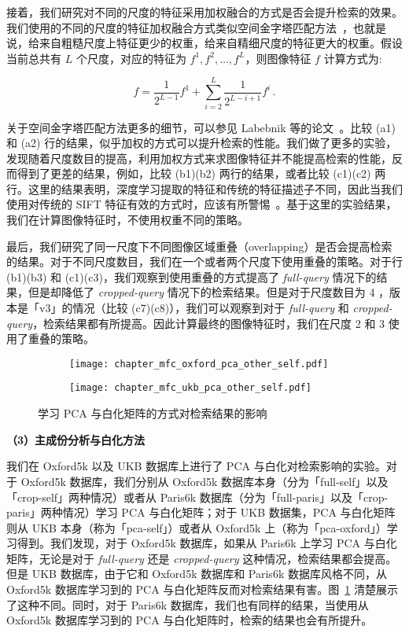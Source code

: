 接着，我们研究对不同的尺度的特征采用加权融合的方式是否会提升检索的效果。我们使用的不同的尺度的特征加权融合方式类似空间金字塔匹配方法~\cite{Lazebnik2006BeyondBO}，也就是说，给来自粗糙尺度上特征更少的权重，给来自精细尺度的特征更大的权重。假设当前总共有 $L$ 个尺度，对应的特征为 $f^1, f^2, \ldots, f^L$，则图像特征 $f$ 计算方式为:

\begin{equation}
f = \frac{1}{2^{L-1}}f^1 + \sum_{i=2}^{L}\frac{1}{2^{L-i+1}}f^i\, .
\end{equation}

关于空间金字塔匹配方法更多的细节，可以参见 Labebnik 等的论文~\cite{Lazebnik2006BeyondBO}。比较 (a1) 和 (a2) 行的结果，似乎加权的方式可以提升检索的性能。我们做了更多的实验，发现随着尺度数目的提高，利用加权方式来求图像特征并不能提高检索的性能，反而得到了更差的结果，例如，比较 (b1)(b2) 两行的结果，或者比较 (c1)(c2) 两行。这里的结果表明，深度学习提取的特征和传统的特征描述子不同，因此当我们使用对传统的 SIFT 特征有效的方式时，应该有所警惕~\cite{Babenko2015AggregatingLD}。基于这里的实验结果，我们在计算图像特征时，不使用权重不同的策略。

最后，我们研究了同一尺度下不同图像区域重叠（overlapping）是否会提高检索的结果。对于不同尺度数目，我们在一个或者两个尺度下使用重叠的策略。对于行 (b1)(b3) 和 (c1)(c3)，我们观察到使用重叠的方式提高了 \emph{full-query} 情况下的结果，但是却降低了 \emph{cropped-query} 情况下的检索结果。但是对于尺度数目为 4 ，版本是「v3」的情况（比较 (c7)(c8)），我们可以观察到对于 \emph{full-query} 和 \emph{cropped-query}，检索结果都有所提高。因此计算最终的图像特征时，我们在尺度 2 和 3 使用了重叠的策略。


\begin{figure}[!t]
	\centering
	\begin{subfigure}{.5\columnwidth}
		\centering
		\texttt{[image: chapter\_mfc\_oxford\_pca\_other\_self.pdf]}
	\end{subfigure}%
	\hfill
	\begin{subfigure}{.5\columnwidth}
		\centering
		\texttt{[image: chapter\_mfc\_ukb\_pca\_other\_self.pdf]}
	\end{subfigure}
	\caption{学习 PCA 与白化矩阵的方式对检索结果的影响}
	\label{fig:pca_self_other_exp}
\end{figure}

\noindent\textbf{（3）主成份分析与白化方法}

我们在 Oxford5k 以及 UKB 数据库上进行了 PCA 与白化对检索影响的实验。对于 Oxford5k 数据库，我们分别从 Oxford5k 数据库本身（分为「full-self」以及「crop-self」两种情况）或者从 Paris6k 数据库（分为「full-paris」以及「crop-paris」两种情况）学习 PCA 与白化矩阵；对于 UKB 数据集，PCA 与白化矩阵则从 UKB 本身（称为「pca-self」）或者从 Oxford5k 上（称为「pca-oxford」）学习得到。我们发现，对于 Oxford5k 数据库，如果从 Paris6k 上学习 PCA 与白化矩阵，无论是对于 \emph{full-query} 还是 \emph{cropped-query} 这种情况，检索结果都会提高。但是 UKB 数据库，由于它和 Oxford5k 数据库和 Paris6k 数据库风格不同，从 Oxford5k 数据库学习到的 PCA 与白化矩阵反而对检索结果有害。图~\ref{fig:pca_self_other_exp} 清楚展示了这种不同。同时，对于 Paris6k 数据库，我们也有同样的结果，当使用从 Oxford5k 数据库学习到的 PCA 与白化矩阵时，检索的结果也会有所提升。

